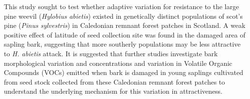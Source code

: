 \documentclass[a4paper, 11pt]{article}
\begin{document}
This study sought to test whether adaptive variation for resistance to the large pine weevil (\textit{Hylobius abietis}) existed in genetically distinct populations of scot's pine (\textit{Pinus sylvestris}) in Caledonian remnant forest patches in Scotland. A weak positive effect of latitude of seed collection site was found in the damaged area of sapling bark, suggesting that more southerly populations may be less attractive to \textit{H. abietis} attack. It is suggested that further studies investigate bark morphological variation and concentrations and variation in Volatile Organic Compounds (VOCs) emitted when bark is damaged in young saplings cultivated from seed stock collected from these Caledonian remnant forest patches to understand the underlying mechanism for this variation in attractiveness. 



\end{document}
